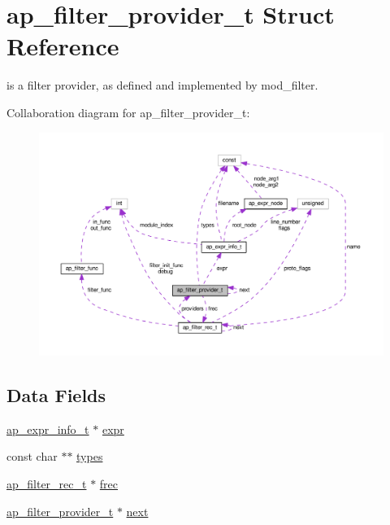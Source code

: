 \hypertarget{structap__filter__provider__t}{}\section{ap\+\_\+filter\+\_\+provider\+\_\+t Struct Reference}
\label{structap__filter__provider__t}


is a filter provider, as defined and implemented by mod\+\_\+filter.  




Collaboration diagram for ap\+\_\+filter\+\_\+provider\+\_\+t\+:
\nopagebreak
\begin{figure}[H]
\begin{center}
\leavevmode
\includegraphics[width=350pt]{structap__filter__provider__t__coll__graph}
\end{center}
\end{figure}
\subsection*{Data Fields}
\begin{DoxyCompactItemize}
\item 
\hyperlink{structap__expr__info__t}{ap\+\_\+expr\+\_\+info\+\_\+t} $\ast$ \hyperlink{structap__filter__provider__t_a8286544693393cead60806478341a7ae}{expr}
\item 
const char $\ast$$\ast$ \hyperlink{structap__filter__provider__t_a0c4f4d740896e2f9bb7cd25159b1ed6f}{types}
\item 
\hyperlink{structap__filter__rec__t}{ap\+\_\+filter\+\_\+rec\+\_\+t} $\ast$ \hyperlink{structap__filter__provider__t_a979fdd2b4e8e7666e331281ed15dcb76}{frec}
\item 
\hyperlink{structap__filter__provider__t}{ap\+\_\+filter\+\_\+provider\+\_\+t} $\ast$ \hyperlink{structap__filter__provider__t_a2f312ea87aef10c12cabef6f9f8e77ee}{next}
\end{DoxyCompactItemize}



